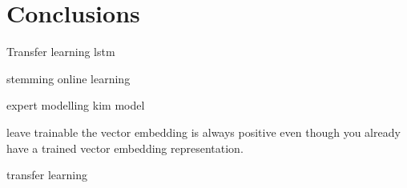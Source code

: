 \section{Conclusions} \label{sec:conclusion}

Transfer learning  lstm

stemming online learning 

expert modelling kim model

leave trainable the vector embedding is always positive even though you already have a trained vector embedding representation.

transfer learning